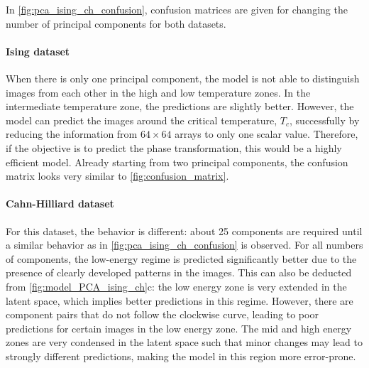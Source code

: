 \documentclass[11pt, authoryear]{elsarticle}
\begin{document}
\begin{appendix}
		In \cref{fig:pca_ising_ch_confusion}, confusion matrices are given for changing the number of principal components for both datasets.
		
		\paragraph{Ising dataset} When there is only one principal component, the model is not able to distinguish images from each other in the high and low temperature zones. In the intermediate temperature zone, the predictions are slightly better. However, the model can predict the images around the critical temperature, $T_c$, successfully by reducing the information from $64\times64$ arrays to only one scalar value. Therefore, if the objective is to predict the phase transformation, this would be a highly efficient model. Already starting from two principal components, the confusion matrix looks very similar to \cref{fig:confusion_matrix}. 
		
		\paragraph{Cahn-Hilliard dataset} For this dataset, the behavior is different: about 25 components are required until a similar behavior as in \cref{fig:pca_ising_ch_confusion} is observed. For all numbers of components, the low-energy regime is predicted significantly better due to the presence of clearly developed patterns in the images. This can also be deducted from \cref{fig:model_PCA_ising_ch}c: the low energy zone is very extended in the latent space, which implies better predictions in this regime. However, there are component pairs that do not follow the clockwise curve, leading to poor predictions for certain images in the low energy zone. The mid and high energy zones are very condensed in the latent space such that minor changes may lead to strongly different predictions, making the model in this region more error-prone.
		
		

\end{appendix}
\end{document}
